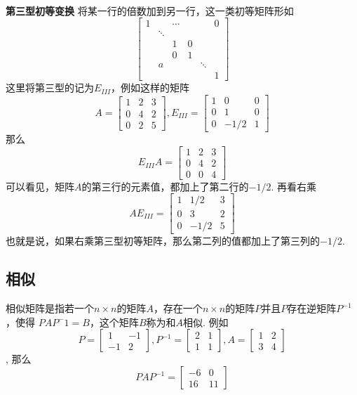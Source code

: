 \paragraph{}
\textbf{第三型初等变换} \:  将某一行的倍数加到另一行，这一类初等矩阵形如
$$
 \begin{bmatrix}
   1 &  & \cdots &  &  & 0 \\
    & \ddots & &  & & \\
    &  & 1 & 0 &  & \\
    & & 0 & 1 & &  \\
    &  a & & & \ddots & \\
    & & & & & 1 
  \end{bmatrix}
$$ 
这里将第三型的记为$E_{III}$，例如这样的矩阵
$$
A =  \begin{bmatrix}
    1 & 2 & 3 \\
    0 & 4 & 2 \\
    0 & 2 & 5
  \end{bmatrix}, E_{III} = \begin{bmatrix}
    1 & 0 & 0 \\
    0 & 1 & 0 \\
    0 & -1/2 & 1  
  \end{bmatrix}
$$
那么
$$
E_{III}A =  \begin{bmatrix}
    1 & 2 & 3 \\
    0 & 4 & 2 \\
    0 & 0 & 4
  \end{bmatrix}
$$
可以看见，矩阵$A$的第三行的元素值，都加上了第二行的$-1/2$. 再看右乘
$$
AE_{III} =  \begin{bmatrix}
    1 & 1/2 & 3 \\
    0 & 3 & 2 \\
    0 & -1/2 & 5
  \end{bmatrix}
$$
也就是说，如果右乘第三型初等矩阵，那么第二列的值都加上了第三列的$-1/2$. 

\subsection{相似}
相似矩阵是指若一个$n\times n$的矩阵$A$，存在一个$n\times n$的矩阵$P$并且$P$存在逆矩阵$P^{-1}$，使得
$PAP^-1 = B$，这个矩阵$B$称为和$A$相似. 例如
$$
P = \begin{bmatrix}
    1 & -1 \\
    -1 & 2
  \end{bmatrix}, P^{-1} = \begin{bmatrix}
    2 & 1 \\
    1 & 1
  \end{bmatrix}, A =  \begin{bmatrix}
    1 & 2 \\
    3 & 4
  \end{bmatrix}
$$, 那么
$$
PAP^{-1} =  \begin{bmatrix}
    -6 & 0 \\
    16 & 11
  \end{bmatrix}
$$


